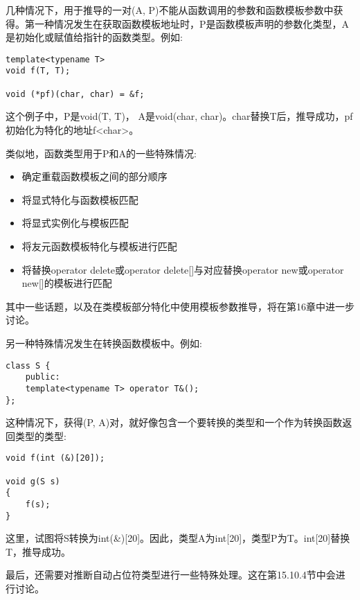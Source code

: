 几种情况下，用于推导的一对(A, P)不能从函数调用的参数和函数模板参数中获得。第一种情况发生在获取函数模板地址时，P是函数模板声明的参数化类型，A是初始化或赋值给指针的函数类型。例如:

\begin{lstlisting}[style=styleCXX]
template<typename T>
void f(T, T);

void (*pf)(char, char) = &f;
\end{lstlisting}

这个例子中，P是void(T, T)， A是void(char, char)。char替换T后，推导成功，pf初始化为特化的地址f<char>。

类似地，函数类型用于P和A的一些特殊情况:

\begin{itemize}
\item 
确定重载函数模板之间的部分顺序

\item 
将显式特化与函数模板匹配

\item 
将显式实例化与模板匹配

\item 
将友元函数模板特化与模板进行匹配

\item 
将替换operator delete或operator delete[]与对应替换operator new或operator new[]的模板进行匹配
\end{itemize}

其中一些话题，以及在类模板部分特化中使用模板参数推导，将在第16章中进一步讨论。

另一种特殊情况发生在转换函数模板中。例如:

\begin{lstlisting}[style=styleCXX]
class S {
	public:
	template<typename T> operator T&();
};
\end{lstlisting}

这种情况下，获得(P, A)对，就好像包含一个要转换的类型和一个作为转换函数返回类型的类型:

\begin{lstlisting}[style=styleCXX]
void f(int (&)[20]);

void g(S s)
{
	f(s);
}
\end{lstlisting}

这里，试图将S转换为int(\&)[20]。因此，类型A为int[20]，类型P为T。int[20]替换T，推导成功。

最后，还需要对推断自动占位符类型进行一些特殊处理。这在第15.10.4节中会进行讨论。


































